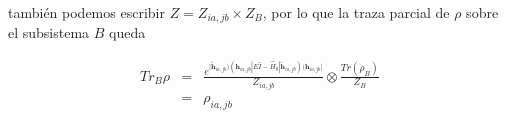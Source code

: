 \documentclass[
	12pt, %
]{fphw}
\begin{document}
también podemos escribir $Z = Z_{ia,jb} \times Z_{B}$, por lo que la traza parcial de $\rho$ sobre el subsistema $B$ queda 

\begin{eqnarray}
	Tr_B \rho &=& \frac{e^{| {\bm{\widetilde{h}}_{ia,jb} ) (\bm{h}_{ia,jb}| E \hat{I} - \hat{H}_0 | 
	\bm{\widetilde{h}}_{ia,jb} )   (\bm{h}_{ia,jb}|}}}{Z_{ia,jb}} \otimes \frac{Tr(\rho_B)}{Z_{B}} \\
	&=& \rho_{ia,jb} 
\end{eqnarray}

\printbibliography
\end{document}
